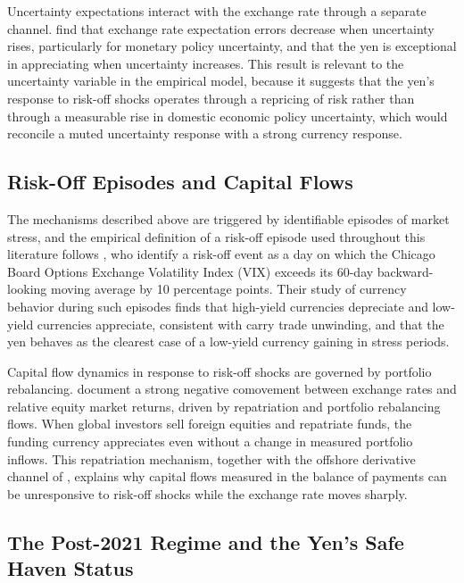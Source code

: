 Uncertainty expectations interact with the exchange rate through a separate channel. \textcite{beckmann_czudaj_2016} find that exchange rate expectation errors decrease when uncertainty rises, particularly for monetary policy uncertainty, and that the yen is exceptional in appreciating when uncertainty increases. This result is relevant to the uncertainty variable in the empirical model, because it suggests that the yen's response to risk-off shocks operates through a repricing of risk rather than through a measurable rise in domestic economic policy uncertainty, which would reconcile a muted uncertainty response with a strong currency response.

\subsection{Risk-Off Episodes and Capital Flows}

The mechanisms described above are triggered by identifiable episodes of market stress, and the empirical definition of a risk-off episode used throughout this literature follows \textcite{debock_carvalhofilho_2013}, who identify a risk-off event as a day on which the Chicago Board Options Exchange Volatility Index (VIX) exceeds its 60-day backward-looking moving average by 10 percentage points. Their study of currency behavior during such episodes finds that high-yield currencies depreciate and low-yield currencies appreciate, consistent with carry trade unwinding, and that the yen behaves as the clearest case of a low-yield currency gaining in stress periods.

Capital flow dynamics in response to risk-off shocks are governed by portfolio rebalancing. \textcite{hau_rey_2006} document a strong negative comovement between exchange rates and relative equity market returns, driven by repatriation and portfolio rebalancing flows. When global investors sell foreign equities and repatriate funds, the funding currency appreciates even without a change in measured portfolio inflows. This repatriation mechanism, together with the offshore derivative channel of \textcite{botman_carvalho_lam_2013}, explains why capital flows measured in the balance of payments can be unresponsive to risk-off shocks while the exchange rate moves sharply.

\subsection{The Post-2021 Regime and the Yen's Safe Haven Status}

